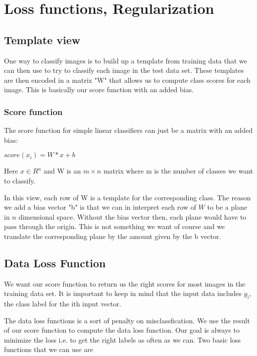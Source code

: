 \documentclass[11pt]{article}
\begin{document}
\section{Loss functions, Regularization}
\label{sec:org98df4dd}

\subsection{Template view}
\label{sec:org791455f}

One way to classify images is to build up a template from training data that we can then use to try to 
classify each image in the test data set. These templates are then encoded in a matrix "W" that allows
us to compute class scores for each image. This is basically our score function with an added bias. 

\subsubsection{Score function}
\label{sec:orgff47e37}

The score function for simple linear classifiers can just be a matrix with an added bias: 

\(score(x_i) = W * x + b\) 

Here \(x \in {R^n}\) and W is an \(m \times n\) matrix where m is the number of classes 
we want to classify. 

In this view, each row of W is a template for the corresponding class. The reason we add a bias
vector "b" is that we can in interpret each row of \(W\) to be a plane in \(n\) dimensional space. 
Without the bias vector then, each plane would have to pass through the origin. This is not something 
we want of course and we translate the corresponding plane by the amount given by the b vector. 

\subsection{Data Loss Function}
\label{sec:org4dfad42}

We want our score function to return us the right scores for most images in the training data set. 
It is important to keep in mind that the input data includes \(y_i\), the class label for 
the ith input vector. 

The data loss functions is a sort of penalty on misclassfication. We use the result of our score function 
to compute the data loss function. Our goal is always to minimize the loss i.e. to get the right labels
as often as we can. Two basic loss functions that we can use are 
\end{document}
